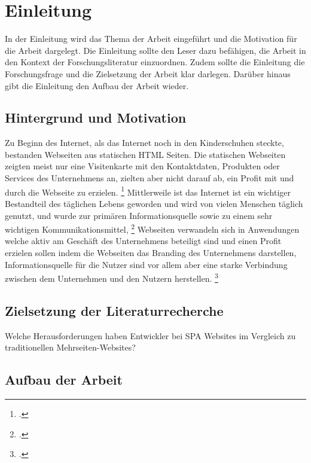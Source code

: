 
\section{Einleitung}
In der Einleitung wird das Thema der Arbeit eingeführt und die Motivation für die Arbeit dargelegt. 
Die Einleitung sollte den Leser dazu befähigen, die Arbeit in den Kontext der Forschungsliteratur einzuordnen.
Zudem sollte die Einleitung die Forschungsfrage und die Zielsetzung der Arbeit klar darlegen.
Darüber hinaus gibt die Einleitung den Aufbau der Arbeit wieder. 

\subsection{Hintergrund und Motivation}
Zu Beginn des Internet, als das Internet noch in den Kinderschuhen steckte, bestanden Webseiten aus statischen \ac{HTML} Seiten.
Die statischen Webseiten zeigten meist nur eine Visitenkarte mit den Kontaktdaten, Produkten oder Services des Unternehmens an,
zielten aber nicht darauf ab, ein Profit mit und durch die Webseite zu erzielen. \footcite[Vgl.][Seite 1]{Bly2018}
Mittlerweile ist das Internet ist ein wichtiger Bestandteil des täglichen Lebens geworden und wird von vielen Menschen täglich genutzt,
und wurde zur primären Informationsquelle sowie zu einem sehr wichtigen Kommunikationsmittel, \footcite[Vgl.][Seite 1]{conf/pi/Sassenberg}
Webseiten verwandeln sich in Anwendungen welche aktiv am Geschäft des Unternehmens beteiligt sind und einen Profit erzielen sollen indem die Webseiten
das Branding des Unternehmens darstellen, Informationsquelle für die Nutzer sind vor allem aber eine starke Verbindung zwischen dem Unternehmen und den Nutzern herstellen. \footcite[Vgl.][Seite 1]{Bly2018}

\subsection{Zielsetzung der Literaturrecherche}
Welche Herausforderungen haben Entwickler bei \ac{SPA} Websites im Vergleich zu traditionellen Mehrseiten-Websites?

\subsection{Aufbau der Arbeit}
